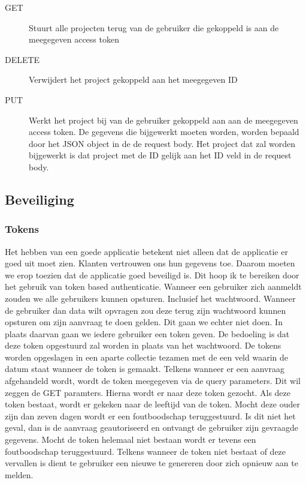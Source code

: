 \documentclass[a4paper,11pt]{article}
\begin{document}
\begin{description}
\item[GET] Stuurt alle projecten terug van de gebruiker die gekoppeld is aan de meegegeven access token
\item[DELETE] Verwijdert het project gekoppeld aan het meegegeven ID
\item[PUT] Werkt het project bij van de gebruiker gekoppeld aan aan de meegegeven access token. De gegevens die bijgewerkt moeten worden, worden bepaald door het JSON object in de de request body. Het project dat zal worden bijgewerkt is dat project met de ID gelijk aan het ID veld in de request body.
\end{description}

\subsection{Beveiliging}
\subsubsection{Tokens}
Het hebben van een goede applicatie betekent niet alleen dat de applicatie er goed uit moet zien. Klanten vertrouwen ons hun gegevens toe. Daarom moeten we erop toezien dat de applicatie goed beveiligd is. Dit hoop ik te bereiken door het gebruik van token based authenticatie. Wanneer een gebruiker zich aanmeldt zouden we alle gebruikers kunnen opsturen. Inclusief het wachtwoord. Wanneer de gebruiker dan data wilt opvragen zou deze terug zijn wachtwoord kunnen opsturen om zijn aanvraag te doen gelden. Dit gaan we echter niet doen. In plaats daarvan gaan we iedere gebruiker een token geven. De bedoeling is dat deze token opgestuurd zal worden in plaats van het wachtwoord. De tokens worden opgeslagen in een aparte collectie tezamen met de een veld waarin de datum staat wanneer de token is gemaakt. Telkens wanneer er een aanvraag afgehandeld wordt, wordt de token meegegeven via de query parameters. Dit wil zeggen de GET paramters. Hierna wordt er naar deze token gezocht. Als deze token bestaat, wordt er gekeken naar de leeftijd van de token. Mocht deze ouder zijn dan zeven dagen wordt er een foutboodschap teruggestuurd. Is dit niet het geval, dan is de aanvraag geautoriseerd en ontvangt de gebruiker zijn gevraagde gegevens. Mocht de token helemaal niet bestaan wordt er tevens een foutboodschap teruggestuurd. Telkens wanneer de token niet bestaat of deze vervallen is dient te gebruiker een nieuwe te genereren door zich opnieuw aan te melden.
\end{document}
